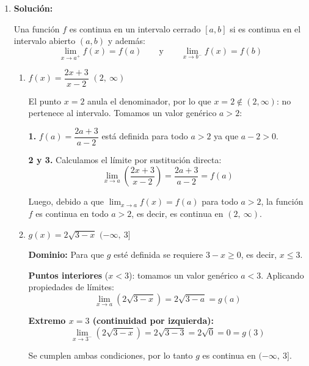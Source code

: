 \documentclass[12pt]{article}
\newcommand{\solucion}{%
    \vspace{0.8em}%
    \textbf{Solución:}%
}
\begin{document}
\begin{enumerate}[label=\alph*.-]
\begin{enumerate}[label=\roman*.]
        Luego, debido a que $\displaystyle\lim_{x \to 1} g(x) = g(1) = -\dfrac{1}{2}$, se tiene que la función $g$ es continua en $x = 1$.

    \end{enumerate}

    \item
    \solucion

    Una función $f$ es continua en un intervalo cerrado $[a, b]$ si es continua en el intervalo abierto $(a, b)$ y además:
    \[
    \lim_{x \to a^+} f(x) = f(a) \qquad \text{y} \qquad \lim_{x \to b^-} f(x) = f(b)
    \]

    \begin{enumerate}[label=\roman*.]

        \item $f(x) = \dfrac{2x+3}{x-2}$ \quad $(2,\ \infty)$

        El punto $x = 2$ anula el denominador, por lo que $x = 2 \notin (2, \infty)$: no pertenece al intervalo. Tomamos un valor genérico $a > 2$:

        \textbf{1.} $f(a) = \dfrac{2a+3}{a-2}$ está definida para todo $a > 2$ ya que $a - 2 > 0$.

        \textbf{2 y 3.} Calculamos el límite por sustitución directa:
        \[
        \lim_{x \to a} \left(\frac{2x+3}{x-2}\right) = \frac{2a+3}{a-2} = f(a)
        \]

        Luego, debido a que $\displaystyle\lim_{x \to a} f(x) = f(a)$ para todo $a > 2$, la función $f$ es continua en todo $a > 2$, es decir, es continua en $(2,\ \infty)$. 

        \vspace{0.5em}
        \item $g(x) = 2\sqrt{3-x}$ \quad $(-\infty,\ 3]$

        \textbf{Dominio:} Para que $g$ esté definida se requiere $3 - x \geq 0$, es decir, $x \leq 3$.

        \textbf{Puntos interiores} ($x < 3$): tomamos un valor genérico $a < 3$. Aplicando propiedades de límites:
        \[
        \lim_{x \to a} \left(2\sqrt{3-x}\right) = 2\sqrt{3-a} = g(a)
        \]

        \textbf{Extremo $x = 3$ (continuidad por izquierda):}
        \[
        \lim_{x \to 3^-} \left(2\sqrt{3-x}\right) = 2\sqrt{3-3} = 2\sqrt{0} = 0 = g(3)
        \]

        Se cumplen ambas condiciones, por lo tanto $g$ es continua en $(-\infty,\ 3]$. 

    \end{enumerate}

\end{enumerate}
\end{document}
